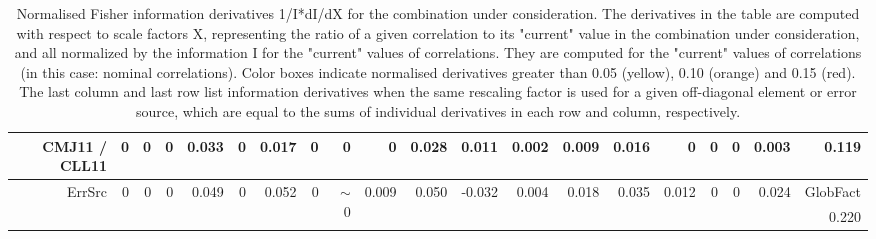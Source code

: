 \begin{table}[H]
\begin{center}
\begin{tabular}{|r|rrrrrrrrrrrrrrrrrr|r|}
CMJ11 / CLL11 &  0 &  0 &  0 &      0.033 &  0 &      0.017 &  0 &  0 &  0 &      0.028 &      0.011 &      0.002 &      0.009 &      0.016 &  0 &  0 &  0 &      0.003 &  \colorbox{Orange1}{    0.119} \\
\hline
\multirow{2}{*}{ErrSrc} & \multirow{2}{*}{ 0} & \multirow{2}{*}{ 0} & \multirow{2}{*}{ 0} & \multirow{2}{*}{     0.049} & \multirow{2}{*}{ 0} & \multirow{2}{*}{ \colorbox{Yellow1}{    0.052}} & \multirow{2}{*}{ 0} & \multirow{2}{*}{ {\tiny $\sim$ }0} & \multirow{2}{*}{     0.009} & \multirow{2}{*}{     0.050} & \multirow{2}{*}{    -0.032} & \multirow{2}{*}{     0.004} & \multirow{2}{*}{     0.018} & \multirow{2}{*}{     0.035} & \multirow{2}{*}{     0.012} & \multirow{2}{*}{ 0} & \multirow{2}{*}{ 0} & \multirow{2}{*}{     0.024} & GlobFact\\
 & & & & & & & & & & & & & & & & & & &  \colorbox{Tomato1}{    0.220} \\
\hline
\end{tabular}
\renewcommand{\arraystretch}{1}
\caption{Normalised Fisher information derivatives 1/I*dI/dX for the combination under consideration. The derivatives in the table are computed with respect to scale factors X, representing the ratio of a given correlation to its "current" value in the combination under consideration, and all normalized by the information I for the "current" values of correlations. They are computed for the "current" values of correlations (in this case: nominal correlations). Color boxes indicate normalised derivatives greater than 0.05 (yellow), 0.10 (orange) and 0.15 (red). The last column and last row list information derivatives when the same rescaling factor is used for a given off-diagonal element or error source, which are equal to the sums of individual derivatives in each row and column, respectively.}
\end{center}
\end{table}
